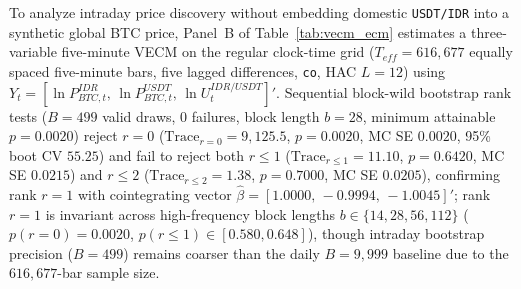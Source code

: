 To analyze intraday price discovery without embedding domestic \texttt{USDT/IDR} into a synthetic global BTC price, Panel~B of Table~\ref{tab:vecm_ecm} estimates a three-variable five-minute VECM on the regular clock-time grid ($T_{eff} = 616,677$ equally spaced five-minute bars, five lagged differences, \texttt{co}, HAC $L = 12$) using $Y_t = [\ln P_{BTC,t}^{IDR},\, \ln P_{BTC,t}^{USDT},\, \ln U_t^{IDR/USDT}]'$. Sequential block-wild bootstrap rank tests ($B = 499$ valid draws, $0$ failures, block length $b = 28$, minimum attainable $p = 0.0020$) reject $r = 0$ ($\text{Trace}_{r=0} = 9,125.5$, $p = 0.0020$, MC SE $0.0020$, 95\% boot CV $55.25$) and fail to reject both $r \le 1$ ($\text{Trace}_{r \le 1} = 11.10$, $p = 0.6420$, MC SE $0.0215$) and $r \le 2$ ($\text{Trace}_{r \le 2} = 1.38$, $p = 0.7000$, MC SE $0.0205$), confirming rank $r = 1$ with cointegrating vector $\hat{\beta} = [1.0000,\,-0.9994,\,-1.0045]'$; rank $r = 1$ is invariant across high-frequency block lengths $b \in \{14, 28, 56, 112\}$ ($p(r=0) = 0.0020$, $p(r \le 1) \in [0.580, 0.648]$), though intraday bootstrap precision ($B = 499$) remains coarser than the daily $B = 9,999$ baseline due to the $616,677$-bar sample size.

